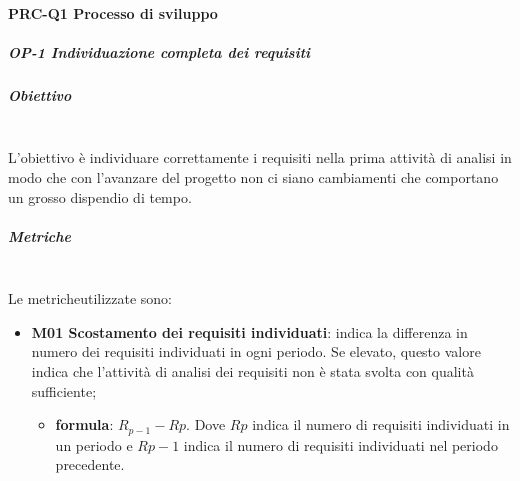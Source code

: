 		\paragraph{PRC-Q1 Processo di sviluppo}
			\subparagraph{OP-1 Individuazione completa dei requisiti}
			\subparagraph*{Obiettivo}\mbox{}\\ [1mm]
			L'obiettivo è individuare correttamente i requisiti nella prima attività di analisi in modo che con l'avanzare del progetto non ci siano cambiamenti che comportano un grosso dispendio di tempo.
			\subparagraph*{Metriche}\mbox{}\\ [1mm]
			Le metriche\glosp utilizzate sono:
			\begin{itemize}
				\item \textbf{M01 Scostamento dei requisiti individuati}: indica la differenza in numero dei requisiti individuati in ogni periodo. Se elevato, questo valore indica che l'attività di analisi dei requisiti non è stata svolta con qualità sufficiente;
				\begin{itemize}
					\item[] \textbf{formula}: $R_{p-1}-R{p}$. Dove $R{p}$ indica il numero di requisiti individuati in un periodo e $R{p-1}$ indica il numero di requisiti individuati nel periodo precedente.
				\end{itemize} 
			\end{itemize}
			

